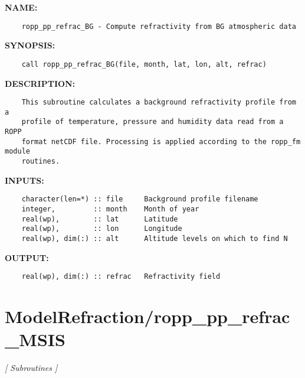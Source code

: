 \label{ch:robo39}
\label{ch:ModelRefraction_ropp_pp_refrac_BG}
\textbf{NAME:}\hspace{0.08in}\begin{Verbatim}
    ropp_pp_refrac_BG - Compute refractivity from BG atmospheric data
\end{Verbatim}
\textbf{SYNOPSIS:}\hspace{0.08in}\begin{Verbatim}
    call ropp_pp_refrac_BG(file, month, lat, lon, alt, refrac)
\end{Verbatim}
\textbf{DESCRIPTION:}\hspace{0.08in}\begin{Verbatim}
    This subroutine calculates a background refractivity profile from a
    profile of temperature, pressure and humidity data read from a ROPP
    format netCDF file. Processing is applied according to the ropp_fm module
    routines.
\end{Verbatim}
\textbf{INPUTS:}\hspace{0.08in}\begin{Verbatim}
    character(len=*) :: file     Background profile filename
    integer,         :: month    Month of year
    real(wp),        :: lat      Latitude
    real(wp),        :: lon      Longitude
    real(wp), dim(:) :: alt      Altitude levels on which to find N
\end{Verbatim}
\textbf{OUTPUT:}\hspace{0.08in}\begin{Verbatim}
    real(wp), dim(:) :: refrac   Refractivity field
\end{Verbatim}
\section{ModelRefraction/ropp\_pp\_refrac\_MSIS}
\textsl{[ Subroutines ]}

